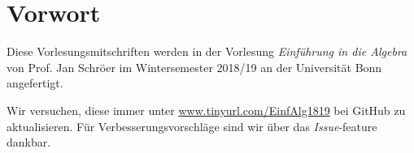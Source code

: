 \chapter*{Vorwort}
Diese Vorlesungsmitschriften werden in der Vorlesung \textit{Einführung in die Algebra} von Prof. Jan Schröer im Wintersemester 2018/19 an der Universität Bonn angefertigt.\par
Wir versuchen, diese immer unter \url{www.tinyurl.com/EinfAlg1819} bei GitHub zu aktualisieren. Für Verbesserungsvorschläge sind wir über das \textit{Issue}-feature dankbar.